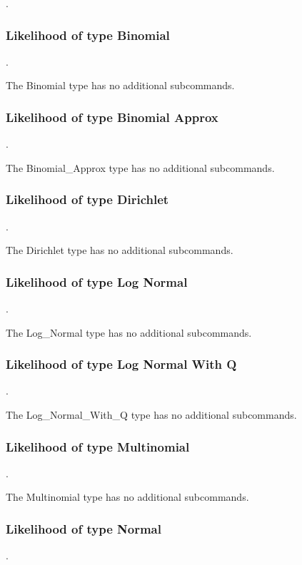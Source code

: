 .
\label{syntax:Likelihood}

\subsubsection{Likelihood of type Binomial}
.
\label{syntax:Likelihood-Binomial}

The Binomial type has no additional subcommands.
\subsubsection{Likelihood of type Binomial Approx}
.
\label{syntax:Likelihood-BinomialApprox}

The Binomial\_Approx type has no additional subcommands.
\subsubsection{Likelihood of type Dirichlet}
.
\label{syntax:Likelihood-Dirichlet}

The Dirichlet type has no additional subcommands.
\subsubsection{Likelihood of type Log Normal}
.
\label{syntax:Likelihood-LogNormal}

The Log\_Normal type has no additional subcommands.
\subsubsection{Likelihood of type Log Normal With Q}
.
\label{syntax:Likelihood-LogNormalWithQ}

The Log\_Normal\_With\_Q type has no additional subcommands.
\subsubsection{Likelihood of type Multinomial}
.
\label{syntax:Likelihood-Multinomial}

The Multinomial type has no additional subcommands.
\subsubsection{Likelihood of type Normal}
.
\label{syntax:Likelihood-Normal}

